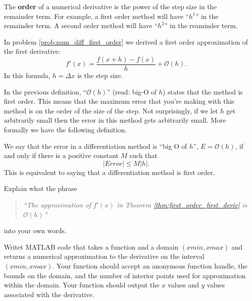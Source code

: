 \begin{definition}
    The {\bf order} of a numerical derivative is the power of the step size in the
    remainder term.  For example, a first order method will have ``$h^1$'' in the
    remainder term.  A second order method will have ``$h^2$'' in the reaminder term.
\end{definition}

\begin{thm}\label{thm:first_order_first_deriv}
    In problem \ref{prob:num_diff_first_order} we derived a first order approximation of
    the first derivative:
    \[ f'(x) = \frac{f(x+h) - f(x)}{h} + \mathcal{O}(h). \]
    In this formula, $h = \Delta x$ is the step size.
\end{thm}
In the previous definition, ``$\mathcal{O}(h)$'' (read: big-O of $h$) states that the
method is first order.  This means that the maximum error that you're making with this
method is on the order of the size of the step.  Not surprisingly, if we let $h$ get
arbitrarily small then the error in this method gets arbitrarily small.  More formally we
have the following definition.

\begin{definition}
    We say that the error in a differentiation method is ``big O of $h$'', $E =
    \mathcal{O}(h)$, if and only if there is a positive constant $M$ such that 
    \[ |Error| \le M |h|. \]
    This is equivalent to saying that a differentiation method is first order.
\end{definition}

\begin{problem}
    Explain what the phrase
    \begin{quote}
        {\it ``The approximation of $f'(x)$ in Theorem \ref{thm:first_order_first_deriv} is $\mathcal{O}(h)$''}
    \end{quote}
    into your own words.  
\end{problem}

\begin{problem}
    Writet MATLAB code that takes a function and a domain $(xmin,xmax)$ and
    returns a numerical approximation to the derivative on the interval
    $(xmin,xmax)$. Your function should accept an anonymous function handle, the
    bounds on the domain, and the number of interior points used for approximation within
    the domain.  Your function should output the $x$ values and $y$ values associated with
    the derivative.\\
\end{problem}

